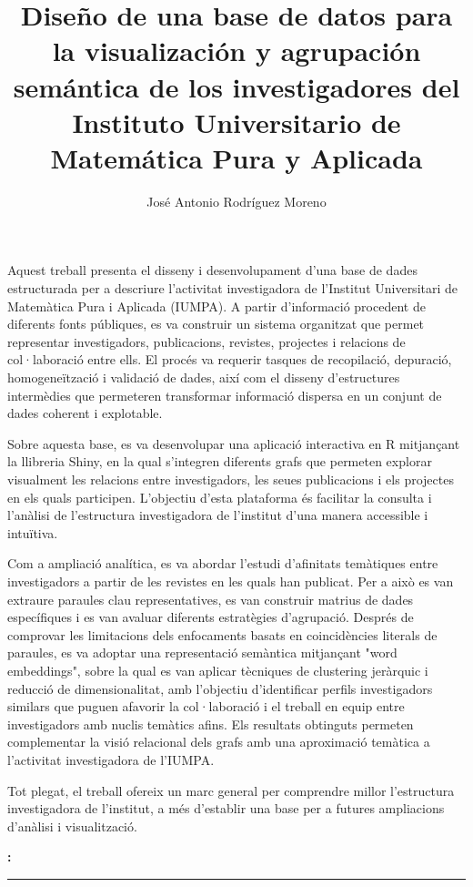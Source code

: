 \documentclass[11pt,spanish,listoffigures,listoftables]{tfgetsinf}
\title{Diseño de una base de datos para la visualización y agrupación semántica de los investigadores del Instituto Universitario de Matemática Pura y Aplicada}
\author{José Antonio Rodríguez Moreno}
\renewenvironment{abstract}[1][catalan]{%
    \begingroup
    \selectlanguage{#1}\vspace{1em}\par\hfill
    {\sffamily\bfseries\Huge\abstractname}\par
    \vspace{0.5em}
}{%
    \par\noindent\textbf{\keywordsname:} \keywords
    \vspace{0.5em}
    \hrule
    \vspace{1em}
    \endgroup
}
\begin{document}

\frontmatter
\thispagestyle{empty}
\null
\clearpage

\begin{abstract}
Aquest treball presenta el disseny i desenvolupament d’una base de dades estructurada per a descriure l’activitat investigadora de l’Institut Universitari de Matemàtica Pura i Aplicada (IUMPA). A partir d’informació procedent de diferents fonts públiques, es va construir un sistema organitzat que permet representar investigadors, publicacions, revistes, projectes i relacions de col·laboració entre ells. El procés va requerir tasques de recopilació, depuració, homogeneïtzació i validació de dades, així com el disseny d’estructures intermèdies que permeteren transformar informació dispersa en un conjunt de dades coherent i explotable.

Sobre aquesta base, es va desenvolupar una aplicació interactiva en R mitjançant la llibreria Shiny, en la qual s’integren diferents grafs que permeten explorar visualment les relacions entre investigadors, les seues publicacions i els projectes en els quals participen. L'objectiu d'esta plataforma és facilitar la consulta i l’anàlisi de l’estructura investigadora de l’institut d’una manera accessible i intuïtiva.

Com a ampliació analítica, es va abordar l'estudi d'afinitats temàtiques entre investigadors a partir de les revistes en les quals han publicat. Per a això es van extraure paraules clau representatives, es van construir matrius de dades específiques i es van avaluar diferents estratègies d’agrupació. Després de comprovar les limitacions dels enfocaments basats en coincidències literals de paraules, es va adoptar una representació semàntica mitjançant "word embeddings", sobre la qual es van aplicar tècniques de clustering jeràrquic i reducció de dimensionalitat, amb l’objectiu d’identificar perfils investigadors similars que puguen afavorir la col·laboració i el treball en equip entre investigadors amb nuclis temàtics afins. Els resultats obtinguts permeten complementar la visió relacional dels grafs amb una aproximació temàtica a l’activitat investigadora de l’IUMPA.

Tot plegat, el treball ofereix un marc general per comprendre millor l'estructura investigadora de l'institut, a més d'establir una base per a futures ampliacions d'anàlisi i visualització.
\end{abstract}
\end{document}
